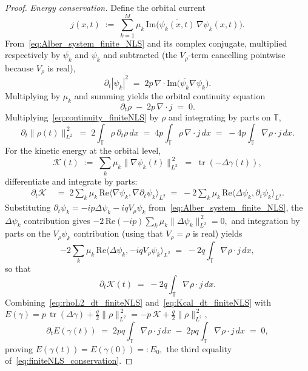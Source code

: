 \documentclass[11pt]{amsart}
\theoremstyle{definition}
\newcommand{\T}{\mathbb{T}}
\DeclareMathOperator{\tr}{tr}
\begin{document}
\begin{proof}
\noindent\emph{Energy conservation.} Define the orbital current
\[
  j(x,t)\;:=\;\sum_{k=1}^{M}\mu_k\,\mathrm{Im}\bigl(\overline{\psi_k(x,t)}\,\nabla\psi_k(x,t)\bigr).
\]
From~\eqref{eq:Alber_system_finite_NLS} and its complex conjugate, multiplied respectively by $\overline{\psi_k}$ and $\psi_k$ and subtracted (the $V_\rho$-term cancelling pointwise because $V_\rho$ is real),
\[
  \partial_t|\psi_k|^2\;=\;2p\,\nabla\!\cdot\!\mathrm{Im}\bigl(\overline{\psi_k}\nabla\psi_k\bigr).
\]
Multiplying by $\mu_k$ and summing yields the orbital continuity equation
\begin{equation}\label{eq:continuity_finiteNLS}
  \partial_t\rho\;-\;2p\,\nabla\!\cdot\!j\;=\;0.
\end{equation}
Multiplying~\eqref{eq:continuity_finiteNLS} by $\rho$ and integrating by parts on $\T,$
\begin{equation}\label{eq:rhoL2_dt_finiteNLS}
  \partial_t\|\rho(t)\|_{L^2}^{\,2}\;=\;2\!\int_\T\rho\,\partial_t\rho\,dx\;=\;4p\!\int_\T\rho\,\nabla\!\cdot\!j\,dx\;=\;-4p\!\int_\T\nabla\rho\cdot j\,dx.
\end{equation}
For the kinetic energy at the orbital level,
\[
  \mathcal{K}(t)\;:=\;\sum_k\mu_k\|\nabla\psi_k(t)\|_{L^2}^{\,2}\;=\;\tr(-\Delta\gamma(t)),
\]
differentiate and integrate by parts:
\[
\begin{aligned}
  \partial_t\mathcal{K}
  &\;=\;2\sum_k\mu_k\,\mathrm{Re}\langle\nabla\psi_k,\nabla\partial_t\psi_k\rangle_{L^2}
  \;=\;-2\sum_k\mu_k\,\mathrm{Re}\langle\Delta\psi_k,\partial_t\psi_k\rangle_{L^2}.
\end{aligned}
\]
Substituting $\partial_t\psi_k=-ip\Delta\psi_k-iqV_\rho\psi_k$ from~\eqref{eq:Alber_system_finite_NLS}, the $\Delta\psi_k$ contribution gives $-2\,\mathrm{Re}(-ip)\sum_k\mu_k\|\Delta\psi_k\|_{L^2}^{\,2}=0,$ and integration by parts on the $V_\rho\psi_k$ contribution (using that $V_\rho=\rho$ is real) yields
\[
  -2\sum_k\mu_k\,\mathrm{Re}\langle\Delta\psi_k,-iqV_\rho\psi_k\rangle_{L^2}
  \;=\;-2q\!\int_\T\nabla\rho\cdot j\,dx,
\]
so that
\begin{equation}\label{eq:Kcal_dt_finiteNLS}
  \partial_t\mathcal{K}(t)\;=\;-2q\!\int_\T\nabla\rho\cdot j\,dx.
\end{equation}
Combining~\eqref{eq:rhoL2_dt_finiteNLS} and~\eqref{eq:Kcal_dt_finiteNLS} with $E(\gamma)=p\,\tr(\Delta\gamma)+\tfrac{q}{2}\|\rho\|_{L^2}^{\,2}=-p\,\mathcal{K}+\tfrac{q}{2}\|\rho\|_{L^2}^{\,2},$
\[
  \partial_t E(\gamma(t))
  \;=\;2pq\!\int_\T\nabla\rho\cdot j\,dx\;-\;2pq\!\int_\T\nabla\rho\cdot j\,dx
  \;=\;0,
\]
proving $E(\gamma(t))=E(\gamma(0))=:E_0,$ the third equality of~\eqref{eq:finiteNLS_conservation}.


\end{proof}
\end{document}
